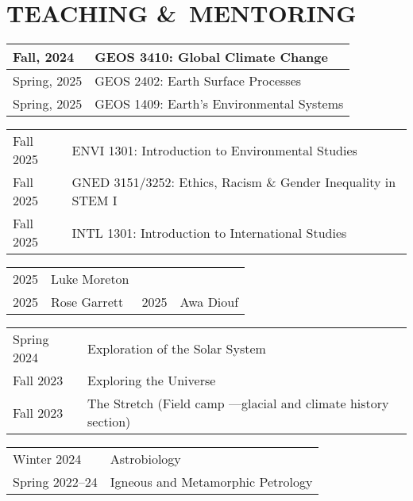 \section{TEACHING \&\ MENTORING}
\begin{tabular}{l l} %
	Fall, 2024\ongoing & GEOS 3410: Global Climate Change\\
	\midrule
	Spring, 2025\ongoing & GEOS 2402: Earth Surface Processes\\
	Spring, 2025\ongoing & GEOS 1409: Earth's Environmental Systems\\
\end{tabular}

\begin{tabular}{l l} %
	Fall 2025 & ENVI 1301: Introduction to Environmental Studies \\
	Fall 2025 & GNED 3151/3252: Ethics, Racism \& Gender Inequality in STEM I\\
	Fall 2025 & INTL 1301: Introduction to International Studies
\end{tabular}

\begin{tabular}{ll|ll}
	2025\ongoing & Luke Moreton
	\\
	2025\ongoing & Rose Garrett
	&
	2025\ongoing & Awa Diouf
\end{tabular}

\begin{tabular}{l l}
	Spring 2024 & Exploration of the Solar System \\
	Fall 2023 & Exploring the Universe \\
	Fall 2023 & The Stretch \normalfont (Field camp ---glacial and climate history section)
\end{tabular}

\begin{tabular}{p{.15\linewidth} l} %
	Winter 2024 & Astrobiology\\
	Spring 2022--24 & Igneous and Metamorphic Petrology
\end{tabular}

